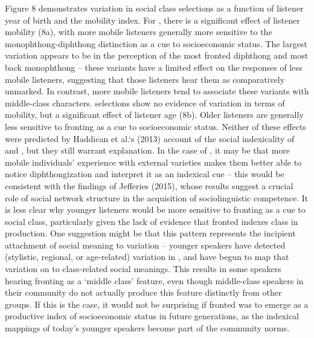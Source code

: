 \documentclass[PWPL]{article}
\begin{document}
Figure 8 demonstrates variation in social class selections as a function of listener year of birth and the mobility index. For , there is a significant effect of listener mobility (8a), with more mobile listeners generally more sensitive to the monophthong-diphthong distinction as a cue to socioeconomic status. The largest variation appears to be in the perception of the most fronted diphthong and most back monophthong -- these variants have a limited effect on the responses of less mobile listeners, suggesting that those listeners hear them as comparatively unmarked. In contrast, more mobile listeners tend to associate these variants with middle-class characters.  selections show no evidence of variation in terms of mobility, but a significant effect of listener age (8b). Older listeners are generally less sensitive to fronting as a cue to socioeconomic status. Neither of these effects were predicted by Haddican et al.`s (2013) account of the social indexicality of  and , but they still warrant explanation. In the case of , it may be that more mobile individuals' experience with external varieties makes them better able to notice diphthongization and interpret it as an indexical cue -- this would be consistent with the findings of Jefferies (2015), whose results suggest a crucial role of social network structure in the acquisition of sociolinguistic competence. It is less clear why younger listeners would be more sensitive to  fronting as a cue to social class, particularly given the lack of evidence that fronted  indexes class in production. One suggestion might be that this pattern represents the incipient attachment of social meaning to  variation -- younger speakers have detected (stylistic, regional, or age-related) variation in , and have begun to map that variation on to class-related social meanings. This results in some speakers hearing fronting as a `middle class' feature, even though middle-class speakers in their community do not actually produce this feature distinctly from other groups. If this is the case, it would not be surprising if fronted  was to emerge as a productive index of socioeconomic status in future generations, as the indexical mappings of today's younger speakers become part of the community norms.
\end{document}
